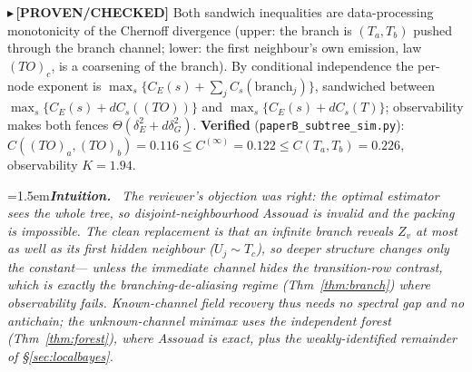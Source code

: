 \documentclass[11pt]{article}
\newcommand{\PROVEN}[1]{{\color{teal}\small$\blacktriangleright$\,\textbf{[PROVEN/CHECKED]} #1}}
\newenvironment{intuition}{\par\smallskip\noindent\hangindent=1.5em\textbf{\itshape Intuition.}\itshape\ \ignorespaces}{\par\smallskip}
\begin{document}
\PROVEN{Both sandwich inequalities are data-processing monotonicity of the Chernoff divergence (upper: the branch
is $(T_a,T_b)$ pushed through the branch channel; lower: the first neighbour's own emission, law $(TO)_c$, is a
coarsening of the branch). By conditional independence the per-node exponent is $\max_s\{C_E(s)+\sum_j C_s(\text{branch}_j)\}$,
sandwiched between $\max_s\{C_E(s)+dC_s((TO))\}$ and $\max_s\{C_E(s)+dC_s(T)\}$; observability makes both fences
$\Theta(\delta_E^2+d\delta_G^2)$. \textbf{Verified} (\texttt{paperB\_subtree\_sim.py}): $C((TO)_a,(TO)_b){=}0.116
\le C^{(\infty)}{=}0.122\le C(T_a,T_b){=}0.226$, observability $K{=}1.94$.}
\begin{intuition}
The reviewer's objection was right: the optimal estimator sees the whole tree, so disjoint-neighbourhood Assouad
is invalid \emph{and} the packing is impossible. The clean replacement is that an infinite branch reveals $Z_v$ at
most as well as its first hidden neighbour ($U_j\sim T_c$), so deeper structure changes only the constant---%
\emph{unless} the immediate channel hides the transition-row contrast, which is exactly the branching-de-aliasing
regime (Thm~\ref{thm:branch}) where observability fails. Known-channel field recovery thus needs no spectral gap
and no antichain; the \emph{unknown}-channel minimax uses the independent forest (Thm~\ref{thm:forest}), where
Assouad is exact, plus the weakly-identified remainder of \S\ref{sec:localbayes}.
\end{intuition}
\end{document}
